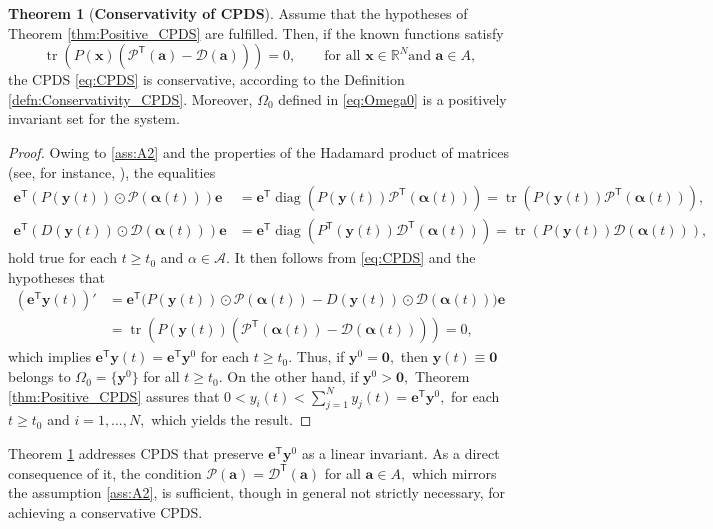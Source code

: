 \documentclass[10pt]{article}
\theoremstyle{remark}
\newcommand{\tpose}{^\mathsf{T}}
\theoremstyle{definition}
\newtheorem{thm}{Theorem}
\theoremstyle{remark}
\DeclareMathOperator{\diag}{diag}
\DeclareMathOperator{\tr}{tr}
\begin{document}
\begin{thm}[\textbf{Conservativity of CPDS}]\label{thm:Conservative_CPDS}
        Assume that the hypotheses of Theorem \ref{thm:Positive_CPDS} are fulfilled. Then, if the known functions satisfy
        \begin{equation}\label{eq:cond_cons_CPDS}
            \tr(P(\bm{x})(\mathcal{P}\tpose(\bm{a})-\mathcal{D}(\bm{a})))=0, \qquad \mbox{for all } \bm{x}\in \mathbb{R}^N \mbox{and } \bm{a}\in A,
        \end{equation}
        the CPDS \eqref{eq:CPDS} is conservative, according to the Definition \ref{defn:Conservativity_CPDS}. Moreover, $\Omega_0$ defined in \eqref{eq:Omega0} is a positively invariant set for the system.
\end{thm}
\begin{proof}
    Owing to \ref{ass:A2} and the properties of the Hadamard product of matrices (see, for instance, \cite[Lemma 7.5.2]{Horn_2012}), the equalities 
    \begin{equation*}
    \begin{split}
        \bm{e}\tpose(P(\bm{y}(t))\odot \mathcal{P}(\bm{\alpha}(t)))\bm{e}&=\bm{e}\tpose\diag(P(\bm{y}(t))\mathcal{P}\tpose(\bm{\alpha}(t)))=\tr(P(\bm{y}(t))\mathcal{P}\tpose(\bm{\alpha}(t))), \\
        \bm{e}\tpose(D(\bm{y}(t))\odot \mathcal{D}(\bm{\alpha}(t)))\bm{e}&=\bm{e}\tpose\diag(P\tpose(\bm{y}(t))\mathcal{D}\tpose(\bm{\alpha}(t)))=\tr(P(\bm{y}(t))\mathcal{D}(\bm{\alpha}(t))),
    \end{split}
    \end{equation*}
    hold true for each $t\geq t_0$ and $\alpha \in \mathcal{A}.$ It then follows from \eqref{eq:CPDS} and the hypotheses that
    \begin{equation*}
        \begin{split}
            (\bm{e}\tpose\bm{y}(t))'&=\bm{e}\tpose\big(P(\bm{y}(t))\odot \mathcal{P}(\bm{\alpha}(t))-D(\bm{y}(t))\odot \mathcal{D}(\bm{\alpha}(t)) \big) \bm{e} \\
            &= \tr(P(\bm{y}(t))(\mathcal{P}\tpose(\bm{\alpha}(t))-\mathcal{D}(\bm{\alpha}(t))))=0,
        \end{split}
    \end{equation*}
    which implies $\bm{e}\tpose\bm{y}(t)=\bm{e}\tpose\bm{y}^0$ for each $t \geq t_0.$ Thus, if $\bm{y}^0=\bm{0},$ then $\bm{y}(t)\equiv\bm{0}$ belongs to $\Omega_0=\{\bm{y}^0\}$ for all $t\geq t_0.$ On the other hand, if $\bm{y}^0>\bm{0},$ Theorem \ref{thm:Positive_CPDS} assures that $0<y_i(t)< \sum_{j=1}^Ny_j(t)=\bm{e}\tpose\bm{y}^0,$ for each $t\geq t_0$ and $i=1,\dots,N,$ which yields the result.
\end{proof}
Theorem \ref{thm:Conservative_CPDS} addresses CPDS that preserve $\bm{e}\tpose\bm{y}^0$ as a linear invariant. As a direct consequence of it, the condition $\mathcal{P}(\bm{a})=\mathcal{D}\tpose(\bm{a})$ for all $\bm{a}\in A,$ which mirrors the assumption \ref{ass:A2}, is sufficient, though in general not strictly necessary, for achieving a conservative CPDS.
\end{document}
